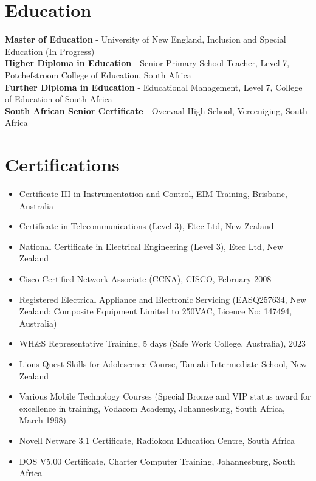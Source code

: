 \documentclass[11pt,a4paper]{article}
\begin{document}
\section*{Education}
\textbf{Master of Education} - University of New England, Inclusion and Special Education (In Progress) \\
\textbf{Higher Diploma in Education} - Senior Primary School Teacher, Level 7, Potchefstroom College of Education, South Africa \\
\textbf{Further Diploma in Education} - Educational Management, Level 7, College of Education of South Africa \\
\textbf{South African Senior Certificate} - Overvaal High School, Vereeniging, South Africa

\section*{Certifications}
\begin{itemize}
    \item Certificate III in Instrumentation and Control, EIM Training, Brisbane, Australia
    \item Certificate in Telecommunications (Level 3), Etec Ltd, New Zealand
    \item National Certificate in Electrical Engineering (Level 3), Etec Ltd, New Zealand
    \item Cisco Certified Network Associate (CCNA), CISCO, February 2008
    \item Registered Electrical Appliance and Electronic Servicing (EASQ257634, New Zealand; Composite Equipment Limited to 250VAC, Licence No: 147494, Australia)
    \item WH\&S Representative Training, 5 days (Safe Work College, Australia), 2023
    \item Lions-Quest Skills for Adolescence Course, Tamaki Intermediate School, New Zealand
    \item Various Mobile Technology Courses (Special Bronze and VIP status award for excellence in training, Vodacom Academy, Johannesburg, South Africa, March 1998)
    \item Novell Netware 3.1 Certificate, Radiokom Education Centre, South Africa
    \item DOS V5.00 Certificate, Charter Computer Training, Johannesburg, South Africa
\end{itemize}
\end{document}
